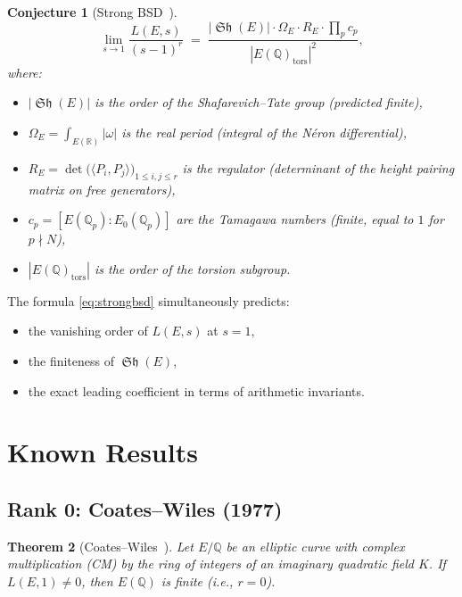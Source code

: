 \documentclass[12pt,a4paper]{article}
\newtheorem{theorem}{Theorem}[section]
\newtheorem{conjecture}[theorem]{Conjecture}
\theoremstyle{remark}
\DeclareMathOperator{\Sha}{\mathfrak{Sh}}
\begin{document}
\begin{conjecture}[Strong BSD~\cite{BSD1965,Tate1966}]
  \begin{equation}\label{eq:strongbsd}
    \lim_{s\to 1} \frac{L(E,s)}{(s-1)^r}
    \;=\;
    \frac{|\Sha(E)| \cdot \Omega_E \cdot R_E \cdot \prod_p c_p}
         {|E(\mathbb{Q})_{\mathrm{tors}}|^2},
  \end{equation}
  where:
  \begin{itemize}[nosep]
    \item $|\Sha(E)|$ is the order of the Shafarevich--Tate group (predicted finite),
    \item $\Omega_E = \int_{E(\mathbb{R})} |\omega|$ is the real period (integral of the
          Néron differential),
    \item $R_E = \det\bigl(\langle P_i, P_j \rangle\bigr)_{1\leq i,j\leq r}$ is the
          regulator (determinant of the height pairing matrix on free generators),
    \item $c_p = [E(\mathbb{Q}_p) : E_0(\mathbb{Q}_p)]$ are the Tamagawa numbers
          (finite, equal to $1$ for $p \nmid N$),
    \item $|E(\mathbb{Q})_{\mathrm{tors}}|$ is the order of the torsion subgroup.
  \end{itemize}
\end{conjecture}

The formula \eqref{eq:strongbsd} simultaneously predicts:
\begin{itemize}[nosep]
  \item the vanishing order of $L(E,s)$ at $s=1$,
  \item the finiteness of $\Sha(E)$,
  \item the exact leading coefficient in terms of arithmetic invariants.
\end{itemize}

\section{Known Results}

\subsection{Rank 0: Coates--Wiles (1977)}

\begin{theorem}[Coates--Wiles~\cite{CoatesWiles1977}]
  Let $E/\mathbb{Q}$ be an elliptic curve with complex multiplication (CM) by the ring
  of integers of an imaginary quadratic field $K$.  If $L(E,1) \neq 0$, then
  $E(\mathbb{Q})$ is finite (i.e., $r = 0$).
\end{theorem}
\end{document}
